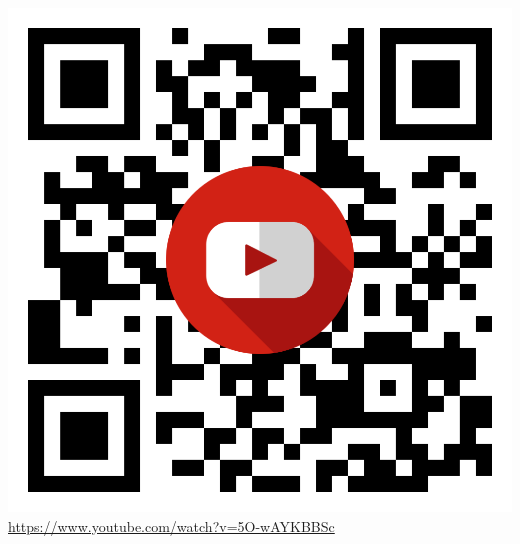 \documentclass[11pt]{article}
\begin{document}
\begin{enumerate}
\begin{minipage}{0.6\textwidth}
  \end{minipage}
  \begin{minipage}{0.3\textwidth}
   \includegraphics[scale=0.14]{resources/qr.png}
   \url{https://www.youtube.com/watch?v=5O-wAYKBBSc}
  \end{minipage}
  

\end{enumerate}
\end{document}
